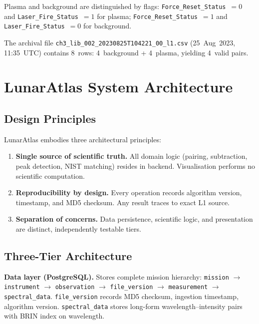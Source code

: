 \documentclass[a4paper,twocolumn,10pt]{article}
\begin{document}
Plasma and background are distinguished by flags:
\texttt{Force\_Reset\_Status}~$=0$ and \texttt{Laser\_Fire\_Status}~$=1$
for plasma; \texttt{Force\_Reset\_Status}~$=1$ and
\texttt{Laser\_Fire\_Status}~$=0$ for background.

The archival file \texttt{ch3\_lib\_002\_20230825T104221\_00\_l1.csv}
(25~Aug~2023, 11:35~UTC) contains 8~rows: 4~background + 4~plasma,
yielding 4~valid pairs.

\section{LunarAtlas System Architecture}
\label{sec:architecture}

\subsection{Design Principles}

LunarAtlas embodies three architectural principles:

\begin{enumerate}[nosep,leftmargin=*]
  \item \textbf{Single source of scientific truth.} All domain logic
    (pairing, subtraction, peak detection, NIST matching) resides in
    backend. Visualisation performs no scientific computation.

  \item \textbf{Reproducibility by design.} Every operation records
    algorithm version, timestamp, and MD5 checksum. Any result traces
    to exact L1 source.

  \item \textbf{Separation of concerns.} Data persistence, scientific
    logic, and presentation are distinct, independently testable tiers.
\end{enumerate}

\subsection{Three-Tier Architecture}

\textbf{Data layer (PostgreSQL).} Stores complete mission hierarchy:
\texttt{mission} $\rightarrow$ \texttt{instrument} $\rightarrow$
\texttt{observation} $\rightarrow$ \texttt{file\_version} $\rightarrow$
\texttt{measurement} $\rightarrow$ \texttt{spectral\_data}.
\texttt{file\_version} records MD5 checksum, ingestion timestamp,
algorithm version. \texttt{spectral\_data} stores long-form
wavelength--intensity pairs with BRIN index on wavelength.
\end{document}
